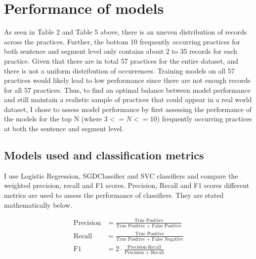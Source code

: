 
\chapter{Performance of models} %

\label{chapter4} %

As seen in Table 2 and Table 5 above, there is an uneven distribution of records across the practices. Further, the bottom 10 frequently occurring practices for both sentence and segment level only contains about 2 to 35 records for each practice. Given that there are in total 57 practices for the entire dataset, and there is not a uniform distribution of occurrences. Training models on all 57 practices would likely lead to low performance since there are not enough records for all 57 practices. Thus, to find an optimal balance between model performance and still maintain a realistic sample of practices that could appear in a real world dataset, I chose to assess model performance by first assessing the performance of the models for the top N (where $3<= N <= 10$) frequently occurring practices at both the sentence and segment level.


\section{Models used and classification metrics}

I use Logistic Regression, SGDClassifier and SVC classifiers and compare the weighted precision, recall and F1 scores. Precision, Recall and F1 scores different metrics are used to assess the performance of classifiers. They are stated mathematically below.

\begin{align*}
	\text{Precision} &= \frac{\text{True Positive}}{\text{True Positive + False Positive}} \\
	\text{Recall} &= \frac{\text{True Positive}}{\text{True Positive + False Negative}} \\
	\text{F1} &= 2 \cdot \frac{\text{Precision} \cdot \text{Recall}}{\text{Precision + Recall}}
\end{align*}

